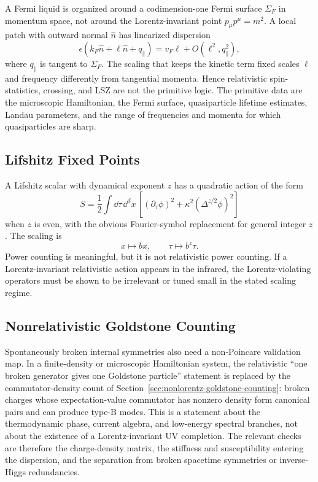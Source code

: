 A Fermi liquid is organized around a codimension-one Fermi surface
\(\Sigma_F\) in momentum space, not around the Lorentz-invariant point
\(p_\mu p^\mu=m^2\).  A local patch with outward normal \(\hat n\) has
linearized dispersion
\[
  \epsilon(k_F\hat n+\ell\hat n+q_\parallel)
  =
  v_F\ell+O(\ell^2,q_\parallel^2),
\]
where \(q_\parallel\) is tangent to \(\Sigma_F\).  The scaling that keeps the
kinetic term fixed scales \(\ell\) and frequency differently from tangential
momenta.  Hence relativistic spin-statistics, crossing, and LSZ are not the
primitive logic.  The primitive data are the microscopic Hamiltonian, the
Fermi surface, quasiparticle lifetime estimates, Landau parameters, and the
range of frequencies and momenta for which quasiparticles are sharp.

\subsection{Lifshitz Fixed Points}

A Lifshitz scalar with dynamical exponent \(z\) has a quadratic action of the
form
\[
  S=\frac12\int\dd\tau\,\dd^d x\,
  \left[
    (\partial_\tau\phi)^2+\kappa^2(\Delta^{z/2}\phi)^2
  \right]
\]
when \(z\) is even, with the obvious Fourier-symbol replacement for general
integer \(z\).  The scaling is
\[
  x\mapsto b x,\qquad \tau\mapsto b^z\tau .
\]
Power counting is meaningful, but it is not relativistic power counting.
If a Lorentz-invariant relativistic action appears in the infrared, the
Lorentz-violating operators must be shown to be irrelevant or tuned small in
the stated scaling regime.

\subsection{Nonrelativistic Goldstone Counting}

Spontaneously broken internal symmetries also need a non-Poincare validation
map.  In a finite-density or microscopic Hamiltonian system, the relativistic
``one broken generator gives one Goldstone particle'' statement is replaced by
the commutator-density count of
Section~\ref{sec:nonlorentz-goldstone-counting}: broken charges whose
expectation-value commutator has nonzero density form canonical pairs and can
produce type-B modes.  This is a statement about the thermodynamic phase,
current algebra, and low-energy spectral branches, not about the existence of a
Lorentz-invariant UV completion.  The relevant checks are therefore the
charge-density matrix, the stiffness and susceptibility entering the
dispersion, and the separation from broken spacetime symmetries or
inverse-Higgs redundancies.

